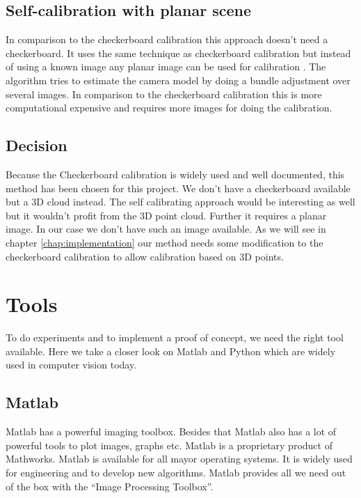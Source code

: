 \documentclass[11pt,a4paper,titlepage,oneside]{report}
\begin{document}
\subsection{Self-calibration with planar scene}
In comparison to the checkerboard calibration this approach doesn't need a checkerboard. It uses the same technique as checkerboard calibration but instead of using a known image any planar image can be used for calibration \cite{selfcalib}. The algorithm tries to estimate the camera model by doing a bundle adjustment over several images. In comparison to the checkerboard calibration this is more computational expensive and requires more images for doing the calibration.

\subsection{Decision}
Because the Checkerboard calibration is widely used and well documented, this method has been chosen for this project. We don't have a checkerboard available but a 3D cloud instead. The self calibrating approach would be interesting as well but it wouldn't profit from the 3D point cloud. Further it requires a planar image. In our case we don't have such an image available. As we will see in chapter \ref{chap:implementation} our method needs some modification to the checkerboard calibration to allow calibration based on 3D points.

\section{Tools}

To do experiments and to implement a proof of concept, we need the right tool available. Here we take a closer look on Matlab and Python which are widely used in computer vision today.

\subsection{Matlab}
Matlab has a powerful imaging toolbox. Besides that Matlab also has a lot of powerful tools to plot images, graphs etc. Matlab is a proprietary product of Mathworks. Matlab is available for all mayor operating systems. It is widely used for engineering and to develop new algorithms. Matlab provides all we need out of the box with the ``Image Processing Toolbox''.
\end{document}
